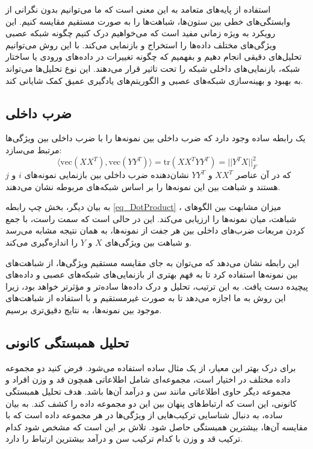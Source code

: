 استفاده از پایه‌های متعامد به این معنی است که ما می‌توانیم بدون نگرانی از وابستگی‌های خطی بین ستون‌ها، شباهت‌ها را به صورت مستقیم مقایسه کنیم. این رویکرد به ویژه زمانی مفید است که می‌خواهیم درک کنیم چگونه شبکه عصبی ویژگی‌های مختلف داده‌ها را استخراج و بازنمایی می‌کند. با این روش می‌توانیم تحلیل‌های دقیقی انجام دهیم و بفهمیم که چگونه تغییرات در داده‌های ورودی یا ساختار شبکه، بازنمایی‌های داخلی شبکه را تحت تاثیر قرار می‌دهند. این نوع تحلیل‌ها می‌تواند به بهبود و بهینه‌سازی شبکه‌های عصبی و الگوریتم‌های یادگیری عمیق کمک شایانی کند.



\subsection{ضرب داخلی}
یک رابطه ساده وجود دارد که ضرب داخلی بین نمونه‌ها را با ضرب داخلی بین ویژگی‌ها مرتبط می‌سازد:
\begin{equation}
	\langle \text{vec}(XX^T), \text{vec}(YY^T) \rangle = \text{tr}(XX^TYY^T) = ||Y^TX||_F^2
	\label{eq_DotProduct}
\end{equation}
که در آن عناصر \(XX^T\) و \(YY^T\) نشان‌دهنده ضرب داخلی بین بازنمایی نمونه‌های \(i\) و \(j\) هستند و شباهت بین این نمونه‌ها را بر اساس شبکه‌های مربوطه نشان می‌دهند. 

به بیان دیگر، بخش چپ رابطه
\eqref{eq_DotProduct}%
، میزان مشابهت بین الگوهای شباهت، میان نمونه‌ها را ارزیابی می‌کند. این در حالی است که سمت راست، با جمع کردن مربعات ضرب‌های داخلی بین هر جفت از نمونه‌ها، به همان نتیجه مشابه می‌رسد و شباهت بین ویژگی‌های \(X\) و \(Y\) را اندازه‌گیری می‌کند.

این رابطه نشان می‌دهد که می‌توان به جای مقایسه مستقیم ویژگی‌ها، از شباهت‌های بین نمونه‌ها استفاده کرد تا به فهم بهتری از بازنمایی‌های شبکه‌های عصبی و داده‌های پیچیده دست یافت. به این ترتیب، تحلیل و درک داده‌ها ساده‌تر و مؤثرتر خواهد بود، زیرا این روش به ما اجازه می‌دهد تا به صورت غیرمستقیم و با استفاده از شباهت‌های موجود بین نمونه‌ها، به نتایج دقیق‌تری برسیم.



\subsection{
	تحلیل همبستگی کانونی%
}
برای درک بهتر این معیار، از یک مثال ساده استفاده می‌شود. فرض کنید دو مجموعه داده مختلف در اختیار است، مجموعه‌ای شامل اطلاعاتی همچون قد و وزن افراد و مجموعه دیگر حاوی اطلاعاتی مانند سن و درآمد آن‌ها باشد. هدف تحلیل همبستگی کانونی، این است که ارتباط‌های پنهان بین این دو مجموعه داده را کشف کند. به بیان ساده،
به دنبال شناسایی ترکیب‌هایی از ویژگی‌ها در هر مجموعه داده است که با مقایسه آن‌ها، بیشترین همبستگی حاصل شود. تلاش بر این است که مشخص شود کدام ترکیب قد و وزن با کدام ترکیب سن و درآمد بیشترین ارتباط را دارد.

